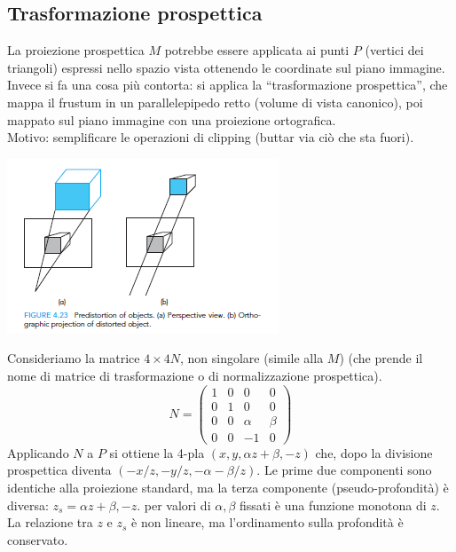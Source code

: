\documentclass[a4paper, 10pt]{article}
\begin{document}
	
	\subsection{Trasformazione prospettica}
		\begin{multicols}{2}
			La proiezione prospettica $ M $ potrebbe essere applicata ai punti $ P $ (vertici dei triangoli) espressi nello spazio vista ottenendo le coordinate sul piano immagine.
			Invece si fa una cosa più contorta: si applica la “trasformazione prospettica”, che mappa il frustum in un parallelepipedo retto (volume di vista canonico), poi mappato sul piano immagine con una proiezione ortografica. \\
			Motivo: semplificare le operazioni di clipping (buttar via ciò che sta fuori).
			
			\columnbreak
			
			\begin{center}
				\includegraphics[scale=0.6]{pipelineg5}
			\end{center}
			
		\end{multicols}
	
		Consideriamo la matrice $ 4 \times 4 N $, non singolare (simile alla $ M $) (che prende il nome di matrice di trasformazione o di normalizzazione prospettica).
		\[
			N =
			\begin{pmatrix}
				1 & 0 & 0 & 0 \\
				0 & 1 & 0 & 0 \\
				0 & 0 & \alpha & \beta \\
				0 & 0 & -1 & 0	
			\end{pmatrix}
		\]
		Applicando $ N $ a $ P $ si ottiene la 4-pla $ (x, y, \alpha z + \beta,-z) $ che, dopo la divisione prospettica diventa $ (-x/z,-y/z, -\alpha-\beta/z) $. Le prime due componenti sono identiche alla proiezione standard, ma la terza componente (pseudo-profondità) è diversa: 
		$ z_s = \alpha z +\beta, -z $. per valori di $ \alpha, \beta $ fissati è una funzione monotona di $ z $. La relazione tra $ z $ e $ z_s $ è non lineare, ma l’ordinamento sulla
		profondità è conservato.
	
\end{document}
